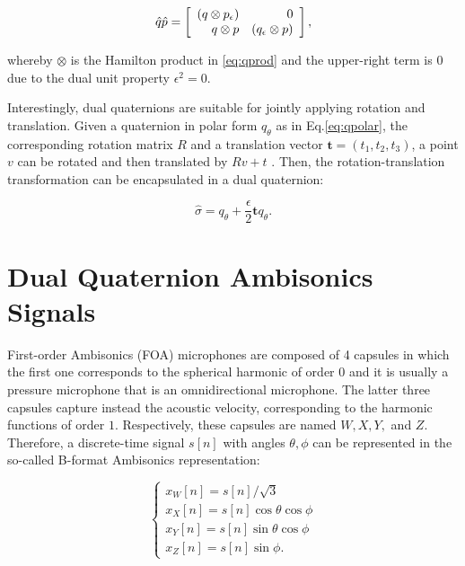 \documentclass[3p, preprint, twocolumn]{elsarticle}
\begin{document}
\begin{equation}
\label{eq:dualqprod}
    \hat{q} \hat{p} = \left[ {\begin{array}{*{20}c}
     \hfill {(q \otimes p_{\epsilon})} & \hfill {0} \\
     \hfill {q \otimes p} &  {(q_{\epsilon} \otimes p)} \\
    \end{array}} \right],
\end{equation}

\noindent whereby $\otimes$ is the Hamilton product in \eqref{eq:qprod} and the upper-right term is $0$ due to the dual unit property $\epsilon^2=0$.

Interestingly, dual quaternions are suitable for jointly applying rotation and translation. Given a quaternion in polar form $q_\theta$ as in Eq.\ref{eq:qpolar}, the corresponding rotation matrix $R$ and a translation vector $\mathbf{t}=(t_1, t_2, t_3)$, a point $v$ can be rotated and then translated by $Rv+t$ \cite{CaoDual2021, Jia2018DualQ}. Then, the rotation-translation transformation can be encapsulated in a dual quaternion:

\begin{equation}
    \hat{\sigma} = q_{\theta} + \frac{\epsilon}{2} \mathbf{t}q_{\theta}.
\end{equation}


\section{Dual Quaternion Ambisonics Signals}
\label{sec:qamb}

First-order Ambisonics (FOA) microphones are composed of 4 capsules in which the first one corresponds to the spherical harmonic of order $0$ and it is usually a pressure microphone that is an omnidirectional microphone. The latter three capsules capture instead the acoustic velocity, corresponding to the harmonic functions of order $1$. Respectively, these capsules are named $W, X, Y,$ and $Z$. Therefore, a discrete-time signal $s[n]$ with angles $\theta, \phi$ can be represented in the so-called B-format Ambisonics representation:

\begin{equation}
\label{eq:qamb}
\begin{cases}
     x_{W}[n] = s[n]/\sqrt{3} \\
     x_{X}[n] = s[n]\cos{\theta}\cos{\phi} \\
     x_{Y}[n] = s[n]\sin{\theta}\cos{\phi} \\
     x_{Z}[n] = s[n]\sin{\phi}.
\end{cases}
\end{equation}
\end{document}
